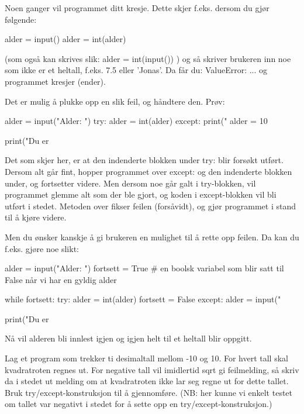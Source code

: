 Noen ganger vil programmet ditt kresje. Dette skjer f.eks. dersom du gjør følgende:
\begin{usncodebox}
alder = input()
alder = int(alder)
\end{usncodebox}

(som også kan skrives slik: alder = int(input()) ) og så skriver brukeren inn noe som ikke er et heltall, f.eks. 7.5 eller 'Jonas'. Da får du: ValueError: ... og programmet kresjer (ender). 

Det er mulig å plukke opp en slik feil, og håndtere den. 
Prøv:
\begin{usncodebox}
alder = input("Alder: ")
try:
    alder = int(alder)
except:
    print("%
    alder = 10 

print("Du er %
\end{usncodebox}
    
Det som skjer her, er at den indenderte blokken under try: blir forsøkt utført. Dersom alt går fint, hopper programmet over except: og den indenderte blokken under, og fortsetter videre. Men dersom noe går galt i try-blokken, vil programmet glemme alt som der ble gjort, og koden i except-blokken vil bli utført i stedet. Metoden over fikser feilen (forsåvidt), og gjør programmet i stand til å kjøre videre. 

Men du ønsker kanskje å gi brukeren en mulighet til å rette opp feilen. Da kan du f.eks. gjøre noe slikt:

\begin{usncodebox}
alder = input("Alder: ")
fortsett = True     # en boolsk variabel som blir satt til False når vi har en gyldig alder

while fortsett: 
    try:
        alder = int(alder)
        fortsett = False
    except:
        alder = input("%

print("Du er %
\end{usncodebox}

Nå vil alderen bli innlest igjen og igjen helt til et heltall blir oppgitt. 

\begin{exercise}
Lag et program som trekker ti desimaltall mellom -10 og 10. For hvert tall skal kvadratroten regnes ut.
For negative tall vil imidlertid sqrt gi feilmelding, så skriv da i stedet ut melding om at kvadratroten ikke lar seg regne ut for dette tallet. Bruk try/except-konstruksjon til å gjennomføre. (NB: her kunne vi enkelt testet om tallet var negativt i stedet for å sette opp en try/except-konstruksjon.)
\end{exercise}

